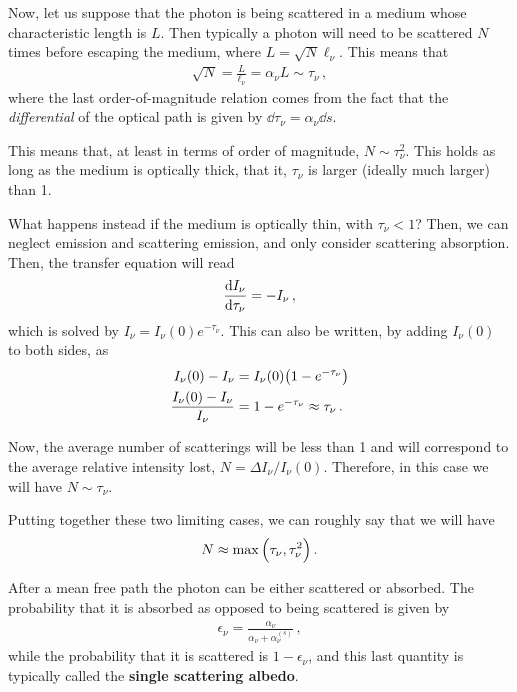\documentclass[main.tex]{subfiles}
\begin{document}
Now, let us suppose that the photon is being scattered in a medium whose characteristic length is \(L\). Then typically a photon will need to be scattered \(N\) times before escaping the medium, where \(L = \sqrt{N} \ell_{\nu }\). 
This means that 
%
\begin{align}
\sqrt{N} = \frac{L}{\ell_{\nu }} = \alpha_{\nu } L \sim \tau_{\nu }
\,,
\end{align}
%
where the last order-of-magnitude relation comes from the fact that the \emph{differential} of the optical path is given by \(\dd{\tau }_{\nu } = \alpha_{\nu } \dd{s}\). 

This means that, at least in terms of order of magnitude, \(N \sim \tau_{\nu }^2\). This holds as long as the medium is optically thick, that it, \(\tau_{\nu }\) is larger (ideally much larger) than 1. 

What happens instead if the medium is optically thin, with \(\tau_{\nu } < 1\)? 
Then, we can neglect emission and scattering emission, and only consider scattering absorption. Then, the transfer equation will read 
%
\begin{align}
\dv{I_\nu }{\tau_{\nu }} = - I_\nu 
\,,
\end{align}
%
which is solved by \(I_\nu = I_\nu (0) e^{-\tau_{\nu }}\). 
This can also be written, by adding \(I_\nu (0)\) to both sides, as 
%
\begin{align}
I_\nu (0 ) - I_\nu  &= I_\nu (0) \qty(1 - e^{-\tau_{\nu }}) \\
\frac{I_\nu (0) - I_\nu }{I_\nu } &= 1 - e^{-\tau_{\nu }} \approx \tau_{\nu }
\,.
\end{align}

Now, the average number of scatterings will be less than 1 and will correspond to the average relative intensity lost, \(N = \Delta I_\nu / I_\nu (0)\). Therefore, in this case we will have \(N \sim \tau_{\nu }\). 

Putting together these two limiting cases, we can roughly say that we will have 
%
\begin{align}
N \approx \max \qty(\tau_{\nu },  \tau_{\nu }^2)
\,.
\end{align}

After a mean free path the photon can be either scattered or absorbed. 
The probability that it is absorbed as opposed to being scattered is given by 
%
\begin{align}
\epsilon_{\nu } = \frac{\alpha_{\nu }}{\alpha_{\nu } + \alpha_{\nu }^{(s)}}
\,,
\end{align}
%
while the probability that it is scattered is \(1 - \epsilon_{\nu }\), and this last quantity is typically called the \textbf{single scattering albedo}.
\end{document}
